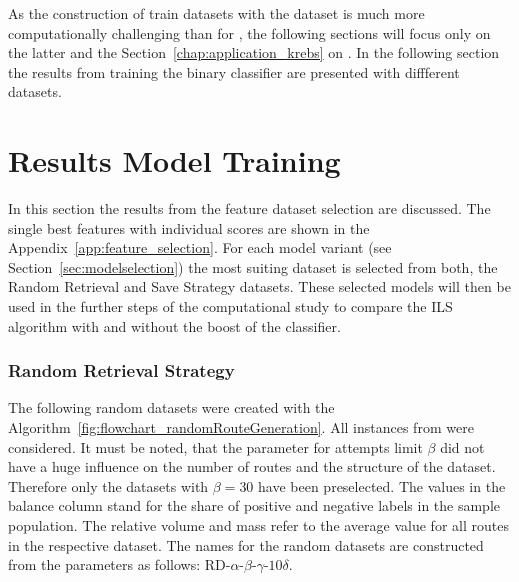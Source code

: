 \parbreak

As the construction of train datasets with the \krebsADataSetText dataset is much more computationally challenging than for \gendreauDataSet,
the following sections will focus only on the latter and the Section~\ref{chap:application_krebs} on \krebsADataSet.
In the following section the results from training the binary classifier are presented with diffferent datasets.

\section{Results Model Training}
\label{sec:ResultsTraining}
In this section the results from the feature dataset selection are discussed. The single best features
with individual scores are shown in the Appendix~\ref{app:feature_selection}. For each model variant (see Section~\ref{sec:modelselection})
the most suiting dataset is selected from both, the Random Retrieval and Save Strategy datasets. These selected
models will then be used in the further steps of the computational study to compare the \gls{ILS} algorithm
with and without the boost of the classifier.

\subsubsection{Random Retrieval Strategy}
The following random datasets were created with the Algorithm~\ref{fig:flowchart_randomRouteGeneration}. All instances
from \gendreauDataSetText were considered. It must be noted, that the parameter for attempts limit $\beta$ did not have a huge influence on
the number of routes and the structure of the dataset. Therefore only the datasets with $\beta = 30$ have been preselected.
The values in the balance column stand for the share of positive and negative labels in the sample population. The relative volume
and mass refer to the average value for all routes in the respective dataset. The names for the random datasets are constructed from
the parameters as follows: RD-$\alpha$-$\beta$-$\gamma$-$10\delta$.

